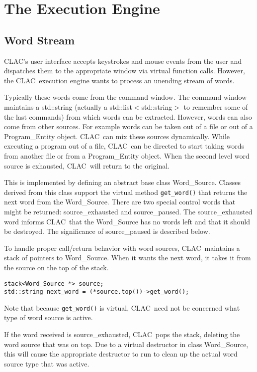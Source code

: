 \documentclass{report}
\newcommand{\CLAC}{CLAC}
\begin{document}
\chapter{The Execution Engine}

\section{Word Stream}

\CLAC's user interface accepts keystrokes and mouse events from the user and dispatches them to the appropriate window via virtual function calls. However, the \CLAC\ execution engine wants to process an unending stream of words.

Typically these words come from the command window. The command window maintains a std::string (actually a std::list$<$std::string$>$ to remember some of the last commands) from which words can be extracted. However, words can also come from other sources. For example words can be taken out of a file or out of a Program\_Entity object. \CLAC\ can mix these sources dynamically. While executing a program out of a file, \CLAC\ can be directed to start taking words from another file or from a Program\_Entity object. When the second level word source is exhausted, \CLAC\ will return to the original.

This is implemented by defining an abstract base class Word\_Source. Classes derived from this class support the virtual method \texttt{get\_word()} that returns the next word from the Word\_Source. There are two special control words that might be returned: source\_exhausted and source\_paused. The source\_exhausted word informs \CLAC\ that the Word\_Source has no words left and that it should be destroyed. The significance of source\_paused is described below.

To handle proper call/return behavior with word sources, \CLAC\ maintains a stack of pointers to Word\_Source. When it wants the next word, it takes it from the source on the top of the stack.

\begin{verbatim}
stack<Word_Source *> source;
std::string next_word = (*source.top())->get_word();
\end{verbatim}

Note that because \texttt{get\_word()} is virtual, \CLAC\ need not be concerned what type of word source is active.

If the word received is source\_exhausted, \CLAC\ pops the stack, deleting the word source that was on top. Due to a virtual destructor in class Word\_Source, this will cause the appropriate destructor to run to clean up the actual word source type that was active.
\end{document}
